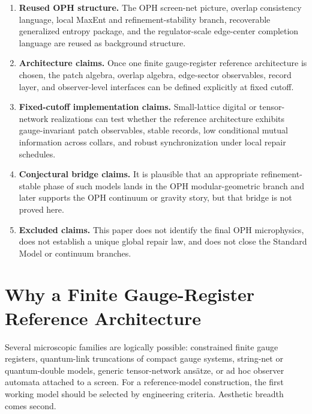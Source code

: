 \documentclass[11pt]{article}
\begin{document}
\begin{enumerate}[leftmargin=2em,label=\textbf{(\roman*)}]
\item \textbf{Reused OPH structure.} The OPH screen-net picture, overlap consistency language,
local MaxEnt and refinement-stability branch, recoverable generalized entropy package, and the
regulator-scale edge-center completion language are reused as background structure.

\item \textbf{Architecture claims.} Once one finite gauge-register reference architecture is
chosen, the patch algebra, overlap algebra, edge-sector observables, record layer, and
observer-level interfaces can be defined explicitly at fixed cutoff.

\item \textbf{Fixed-cutoff implementation claims.} Small-lattice digital or tensor-network realizations can test
whether the reference architecture exhibits gauge-invariant patch observables, stable records,
low conditional mutual information across collars, and robust synchronization under local repair
schedules.

\item \textbf{Conjectural bridge claims.} It is plausible that an appropriate refinement-stable
phase of such models lands in the OPH modular-geometric branch and later supports the OPH
continuum or gravity story, but that bridge is not proved here.

\item \textbf{Excluded claims.} This paper does not identify the final OPH microphysics, does not
establish a unique global repair law, and does not close the Standard Model or continuum branches.
\end{enumerate}

\section{Why a Finite Gauge-Register Reference Architecture}

Several microscopic families are logically possible: constrained finite gauge registers,
quantum-link truncations of compact gauge systems, string-net or quantum-double models,
generic tensor-network ans\"atze, or ad hoc observer automata attached to a screen. For a
reference-model construction, the first working model should be selected by engineering
criteria. Aesthetic breadth comes second.
\end{document}
